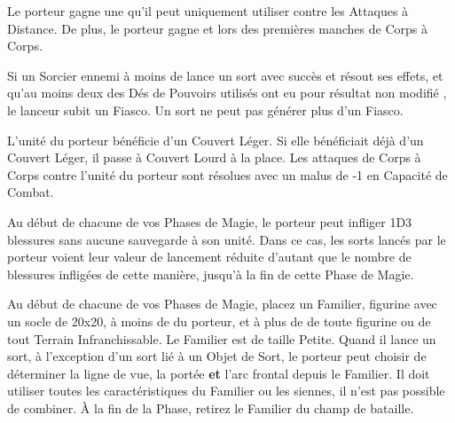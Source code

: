 \endpricelist

\armytalismans

\startpricelist

Le porteur gagne une  qu'il peut uniquement utiliser contre les Attaques à Distance. De plus, le porteur gagne  et  lors des premières manches de Corps à Corps.

Si un Sorcier ennemi à moins de  lance un sort avec succès et résout ses effets, et qu'au moins deux des Dés de Pouvoirs utilisés ont eu pour résultat non modifié , le lanceur subit un Fiasco. Un sort ne peut pas générer plus d'un Fiasco.

\endpricelist

\armyenchanteditems

\startpricelist

L'unité du porteur bénéficie d'un Couvert Léger. Si elle bénéficiait déjà d'un Couvert Léger, il passe à Couvert Lourd à la place. Les attaques de Corps à Corps contre l'unité du porteur sont résolues avec un malus de -1 en Capacité de Combat.

\endpricelist

\armyarcaneitems

\startpricelist

Au début de chacune de vos Phases de Magie, le porteur peut infliger 1D3 blessures sans aucune sauvegarde à son unité. Dans ce cas, les sorts lancés par le porteur voient leur valeur de lancement réduite d'autant que le nombre de blessures infligées de cette manière, jusqu'à la fin de cette Phase de Magie.

Au début de chacune de vos Phases de Magie, placez un Familier, figurine avec un socle de \unit{20x20}{\milli\meter}, à moins de  du porteur, et à plus de  de toute figurine ou de tout Terrain Infranchissable. Le Familier est de taille Petite. Quand il lance un sort, à l'exception d'un sort lié à un Objet de Sort, le porteur peut choisir de déterminer la ligne de vue, la portée \textbf{et} l'arc frontal depuis le Familier. Il doit utiliser toutes les caractéristiques du Familier ou les siennes, il n'est pas possible de combiner. À la fin de la Phase, retirez le Familier du champ de bataille.

\endpricelist

